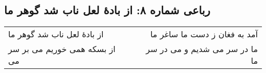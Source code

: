 \begin{center}
\section*{رباعی شماره ۸: از بادهٔ لعل ناب شد گوهر ما}
\label{sec:0008}
\begin{longtable}{l p{0.5cm} r}
از بادهٔ لعل ناب شد گوهر ما
&&
آمد به فغان ز دست ما ساغر ما
\\
از بسکه همی خوریم می بر سر می
&&
ما در سر می شدیم و می در سر ما
\\
\end{longtable}
\end{center}
